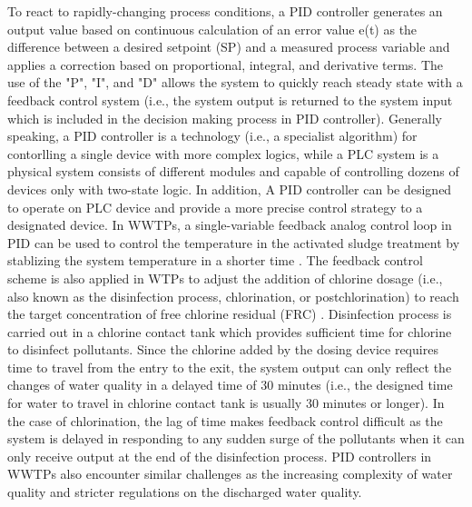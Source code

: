 To react to rapidly-changing process conditions, a PID controller generates an output value based on continuous calculation of an error value e(t) as the difference between a desired setpoint (SP) and a measured process variable and applies a correction based on proportional, integral, and derivative terms. The use of the "P", "I", and "D" allows the system to quickly reach steady state with a feedback control system (i.e., the system output is returned to the system input which is included in the decision making process in PID controller). Generally speaking, a PID controller is a technology (i.e., a specialist algorithm) for contorlling a single device with more complex logics, while a PLC system is a physical system consists of different modules and capable of controlling dozens of devices only with two-state logic. In addition, A PID controller can be designed to operate on PLC device and provide a more precise control strategy to a designated device. In WWTPs, a single-variable feedback analog control loop in PID can be used to control the temperature in the activated sludge treatment by stablizing the system temperature in a shorter time \citep{badosDesignPIDControl2020}. The feedback control scheme is also applied in WTPs to adjust the addition of chlorine dosage (i.e., also known as the disinfection process, chlorination, or postchlorination) to reach the target concentration of free chlorine residual (FRC) \citep{wangCompositeControlPostChlorine2019}. Disinfection process is carried out in a chlorine contact tank which provides sufficient time for chlorine to disinfect pollutants. Since the chlorine added by the dosing device requires time to travel from the entry to the exit, the system output can only reflect the changes of water quality in a delayed time of 30 minutes (i.e., the designed time for water to travel in chlorine contact tank is usually 30 minutes or longer). In the case of chlorination, the lag of time makes feedback control difficult \citep{kobylinskiLineControlStrategies2006} as the system is delayed in responding to any sudden surge of the pollutants when it can only receive output at the end of the disinfection process. PID controllers in WWTPs also encounter similar challenges as the increasing complexity of water quality and stricter regulations on the discharged water quality. 

